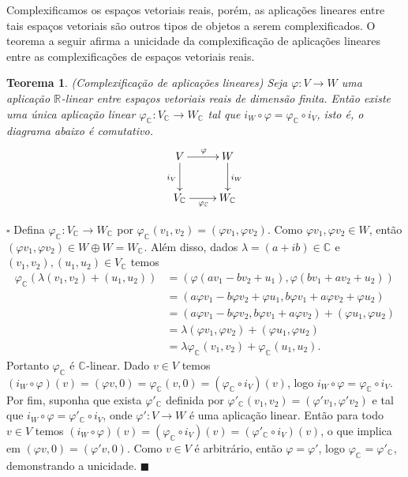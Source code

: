 \documentclass[12pt]{book}
\newtheorem{teorema}{Teorema}[section]
\newenvironment{prova}[1]{$\square$ #1}{\hfill$\blacksquare$}
\newcommand{\complexificacao}[1]{#1_{\complexo{}}}
\newcommand{\complexo}[1]{\mathbb{C}^{#1}}
\newcommand{\real}[1]{\mathbb{R}^{#1}}
\newcommand{\reta}{\real{}}
\begin{document}
	Complexificamos os espaços vetoriais reais, porém, as aplicações lineares entre tais espaços vetoriais são outros tipos de objetos a serem complexificados. O teorema a seguir afirma a unicidade da complexificação de aplicações lineares entre as complexificações de espaços vetoriais reais.
	
	\begin{teorema}
		(Complexificação de aplicações lineares) Seja $\varphi : V \to W$ uma aplicação
		$\reta$-linear entre espaços vetoriais reais de dimensão finita. Então existe uma única aplicação linear $\complexificacao{\varphi}:\complexificacao{V} \to \complexificacao{W}$ tal que $i_{W}\circ \varphi = \complexificacao{\varphi} \circ i_{V}$, isto é, o diagrama abaixo é comutativo.
		$$
		\xymatrix{
			V\ar[d]_{i_{V}}\ar[r]^{\varphi} & W\ar[d]^{i_{W}} 
			\\
			\complexificacao{V} \ar[r]_{\complexificacao{\varphi}}&\complexificacao{W} 
		}
		$$
	\end{teorema}
	\begin{prova}
		Defina $\complexificacao{\varphi}:\complexificacao{V} \to \complexificacao{W}$ por $\complexificacao{\varphi}(v_{1}, v_{2}) = (\varphi v_{1}, \varphi v_{2})$. Como $\varphi v_{1}, \varphi v_{2} \in W$, então $(\varphi v_{1}, \varphi v_{2}) \in W\oplus W = \complexificacao{W}$. Além disso, dados $\lambda = (a+ib)\in \complexo{}$ e $(v_{1}, v_{2}), (u_{1}, u_{2})\in \complexificacao{V}$ temos 
		$$
		\begin{aligned}
		\complexificacao{\varphi} (\lambda(v_{1}, v_{2}) + (u_{1}, u_{2})) 
		&= (\varphi(a v_{1} - bv_{2} + u_{1}), \varphi(b v_{1}+a v_{2} + u_{2}))
		\\
		&=(a\varphi v_{1} - b\varphi v_{2} + \varphi u_{1}, b\varphi v_{1}+a\varphi v_{2} + \varphi u_{2})
		\\
		&=(a\varphi v_{1} - b\varphi v_{2} , b\varphi v_{1}+a\varphi v_{2} )+(\varphi u_{1},\varphi u_{2})
		\\
		&=\lambda(\varphi v_{1},\varphi v_{2})+(\varphi u_{1},\varphi u_{2})
		\\
		&=\lambda 	\complexificacao{\varphi} (v_{1},v_{2})+\complexificacao{\varphi} (u_{1},u_{2}).
		\end{aligned}
		$$
		Portanto $\complexificacao{\varphi}$ é $\complexo{}$-linear. Dado $v \in V$ temos $(i_{W}\circ \varphi)(v) = (\varphi v,0) = \complexificacao{\varphi}(v,0) = (\complexificacao{\varphi} \circ i_{V})(v)$, logo $i_{W}\circ \varphi =\complexificacao{\varphi} \circ i_{V}$. Por fim, suponha que exista $\complexificacao{\varphi'} $ definida por $\complexificacao{\varphi'}(v_{1}, v_{2}) = (\varphi' v_{1}, \varphi' v_{2})$ e tal que $i_{W}\circ \varphi =\complexificacao{\varphi'} \circ i_{V}$, onde $\varphi':V\to W$ é uma aplicação linear. Então para todo $v \in V$ temos $(i_{W}\circ \varphi )(v)=(\complexificacao{\varphi} \circ i_{V})(v) = (\complexificacao{\varphi'} \circ i_{V})(v)$, o que implica em $(\varphi v, 0) = (\varphi' v, 0)$. Como $v \in V$ é arbitrário, então $\varphi = \varphi'$, logo $\complexificacao{\varphi} = \complexificacao{\varphi'}$, demonstrando a unicidade. 
	\end{prova}
	
\end{document}
